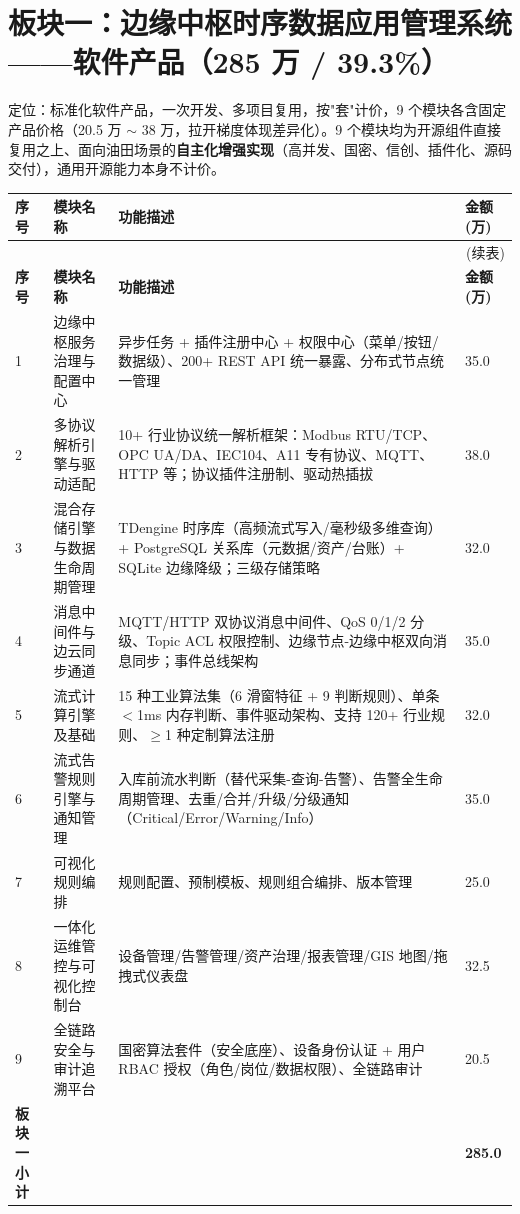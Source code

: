 \documentclass[11pt,a4paper]{ctexart}
\begin{document}
\section{板块一：边缘中枢时序数据应用管理系统——软件产品（285 万 / 39.3\%）}

定位：标准化软件产品，一次开发、多项目复用，按"套"计价，9 个模块各含固定产品价格（20.5 万 $\sim$ 38 万，拉开梯度体现差异化）。9 个模块均为开源组件直接复用之上、面向油田场景的\textbf{自主化增强实现}（高并发、国密、信创、插件化、源码交付），通用开源能力本身不计价。

\begin{longtable}{p{1.2cm} p{3.6cm} p{7.3cm} p{1.7cm}}
\toprule
\textbf{序号} & \textbf{模块名称} & \textbf{功能描述} & \textbf{金额(万)} \\
\midrule
\endfirsthead
\midrule
\multicolumn{4}{r}{(续表)} \\
\toprule
\textbf{序号} & \textbf{模块名称} & \textbf{功能描述} & \textbf{金额(万)} \\
\midrule
\endhead
1 & 边缘中枢服务治理与配置中心 & 异步任务 + 插件注册中心 + 权限中心（菜单/按钮/数据级）、200+ REST API 统一暴露、分布式节点统一管理 & 35.0 \\
2 & 多协议解析引擎与驱动适配 & 10+ 行业协议统一解析框架：Modbus RTU/TCP、OPC UA/DA、IEC104、A11 专有协议、MQTT、HTTP 等；协议插件注册制、驱动热插拔 & 38.0 \\
3 & 混合存储引擎与数据生命周期管理 & TDengine 时序库（高频流式写入/毫秒级多维查询）+ PostgreSQL 关系库（元数据/资产/台账）+ SQLite 边缘降级；三级存储策略 & 32.0 \\
4 & 消息中间件与边云同步通道 & MQTT/HTTP 双协议消息中间件、QoS 0/1/2 分级、Topic ACL 权限控制、边缘节点-边缘中枢双向消息同步；事件总线架构 & 35.0 \\
5 & 流式计算引擎及基础 & 15 种工业算法集（6 滑窗特征 + 9 判断规则）、单条 $<$1ms 内存判断、事件驱动架构、支持 120+ 行业规则、$\geq$1 种定制算法注册 & 32.0 \\
6 & 流式告警规则引擎与通知管理 & 入库前流水判断（替代采集-查询-告警）、告警全生命周期管理、去重/合并/升级/分级通知（Critical/Error/Warning/Info） & 35.0 \\
7 & 可视化规则编排 & 规则配置、预制模板、规则组合编排、版本管理 & 25.0 \\
8 & 一体化运维管控与可视化控制台 & 设备管理/告警管理/资产治理/报表管理/GIS 地图/拖拽式仪表盘 & 32.5 \\
9 & 全链路安全与审计追溯平台 & 国密算法套件（安全底座）、设备身份认证 + 用户 RBAC 授权（角色/岗位/数据权限）、全链路审计 & 20.5 \\
\midrule
\textbf{板块一小计} & & & \textbf{285.0} \\
\bottomrule
\end{longtable}
\end{document}
